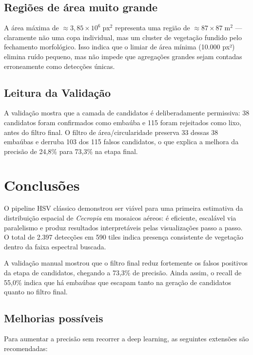 \documentclass[12pt, a4paper]{article}
\begin{document}
\subsection{Regiões de área muito grande}

A área máxima de $\approx 3{,}85 \times 10^6\;\text{px}^2$ representa uma região
de $\approx 87 \times 87\;\text{m}^2$ — claramente não uma copa individual, mas
um cluster de vegetação fundido pelo fechamento morfológico. Isso indica que o
limiar de área mínima (10.000 px²) elimina ruído pequeno, mas não impede que
agregações grandes sejam contadas erroneamente como detecções únicas.

\subsection{Leitura da Validação}

A validação mostra que a camada de candidatos é deliberadamente permissiva:
38 candidatos foram confirmados como embaúba e 115 foram rejeitados como lixo,
antes do filtro final. O filtro de área/circularidade preserva 33 dessas 38
embaúbas e derruba 103 dos 115 falsos candidatos, o que explica a melhora da
precisão de 24,8\% para 73,3\% na etapa final.

\section{Conclusões}

O pipeline HSV clássico demonstrou ser viável para uma primeira estimativa da
distribuição espacial de \textit{Cecropia} em mosaicos aéreos: é eficiente,
escalável via paralelismo e produz resultados interpretáveis pelas visualizações
passo a passo. O total de 2.397 detecções em 590 tiles indica presença
consistente de vegetação dentro da faixa espectral buscada.

A validação manual mostrou que o filtro final reduz fortemente os falsos
positivos da etapa de candidatos, chegando a 73,3\% de precisão. Ainda assim, o
recall de 55,0\% indica que há embaúbas que escapam tanto na geração de
candidatos quanto no filtro final.

\subsection*{Melhorias possíveis}

Para aumentar a precisão sem recorrer a deep learning, as seguintes extensões
são recomendadas:
\end{document}
